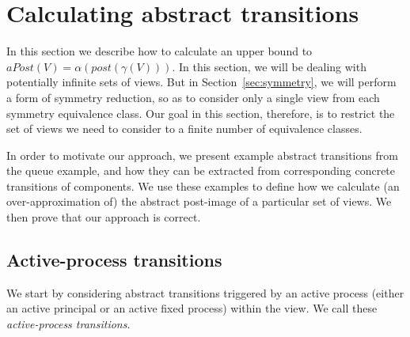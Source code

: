 
\section{Calculating abstract transitions}
\label{sec:transitions}

In this section we describe how to calculate an upper bound to $aPost(V) =
\alpha(post(\gamma(V)))$.  In this section, we will be dealing with
potentially infinite sets of views.  But in Section~\ref{sec:symmetry}, we
will perform a form of symmetry reduction, so as to consider only a single
view from each symmetry equivalence class.  Our goal in this section,
therefore, is to restrict the set of views we need to consider to a finite
number of equivalence classes.

In order to motivate our approach, we present example abstract transitions
from the queue example, and how they can be extracted from
corresponding concrete transitions of components.  We use these examples to
define how we calculate (an over-approximation of) the abstract post-image of
a particular set of views.  We then prove that our approach is correct.

\subsection{Active-process transitions}

We start by considering abstract transitions triggered by an active process
(either an active principal or an active fixed process) within the view.  We
call these \emph{active-process transitions}.

